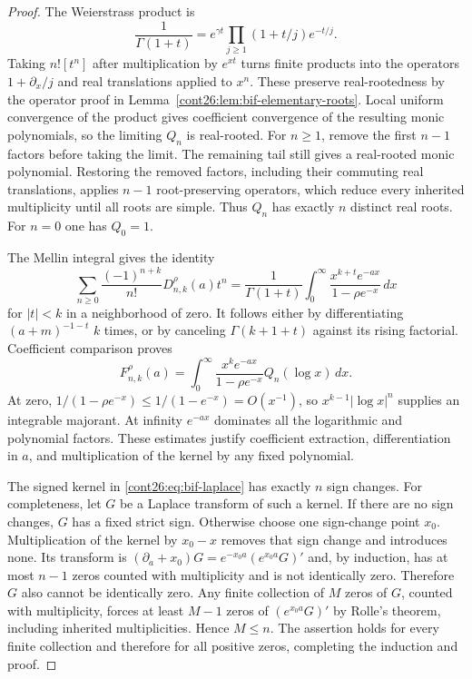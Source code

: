 \begin{proof}
The Weierstrass product is
\[
 \frac1{\Gamma(1+t)}=e^{\gamma t}
             \prod_{j\geq1}(1+t/j)e^{-t/j}.
\]
Taking $n![t^n]$ after multiplication by $e^{xt}$ turns finite products
into the operators $1+\partial_x/j$ and real translations applied to
$x^n$. These preserve real-rootedness by the operator proof in
Lemma~\ref{cont26:lem:bif-elementary-roots}. Local uniform convergence of the
product gives coefficient convergence of the resulting monic polynomials,
so the limiting $Q_n$ is real-rooted. For $n\geq1$, remove the first
$n-1$ factors before taking the limit. The remaining tail still gives
a real-rooted monic polynomial. Restoring the removed factors, including
their commuting real translations, applies $n-1$ root-preserving
operators, which reduce every inherited multiplicity until all roots
are simple. Thus $Q_n$ has exactly $n$ distinct real roots. For $n=0$
one has $Q_0=1$.

The Mellin integral gives the identity
\[
 \sum_{n\geq0}\frac{(-1)^{n+k}}{n!}D_{n,k}^{\rho}(a)t^n
   =\frac1{\Gamma(1+t)}\int_0^\infty
                   \frac{x^{k+t}e^{-ax}}{1-\rho e^{-x}}\,dx
\]
for $|t|<k$ in a neighborhood of zero. It follows either by
differentiating $(a+m)^{-1-t}$ $k$ times, or by canceling
$\Gamma(k+1+t)$ against its rising factorial. Coefficient comparison
proves
\begin{equation}\label{cont26:eq:bif-laplace}
 F_{n,k}^{\rho}(a)=\int_0^\infty
       \frac{x^ke^{-ax}}{1-\rho e^{-x}}Q_n(\log x)\,dx.
\end{equation}
At zero, $1/(1-\rho e^{-x})\leq1/(1-e^{-x})=O(x^{-1})$,
so $x^{k-1}|\log x|^n$ supplies an integrable majorant. At infinity
$e^{-ax}$ dominates all the logarithmic and polynomial factors.
These estimates justify coefficient extraction, differentiation in $a$,
and multiplication of the kernel by any fixed polynomial.

The signed kernel in \eqref{cont26:eq:bif-laplace} has exactly $n$ sign changes.
For completeness, let $G$ be a Laplace transform of such a kernel.
If there are no sign changes, $G$ has a fixed strict sign. Otherwise
choose one sign-change point $x_0$. Multiplication of the kernel by
$x_0-x$ removes that sign change and introduces none. Its transform is
$(\partial_a+x_0)G=e^{-x_0a}(e^{x_0a}G)'$ and, by induction, has at
most $n-1$ zeros counted with multiplicity and is not identically zero.
Therefore $G$ also cannot be identically zero. Any finite collection of
$M$ zeros of $G$, counted with multiplicity, forces at least $M-1$ zeros
of $(e^{x_0a}G)'$ by Rolle's theorem, including inherited multiplicities.
Hence $M\leq n$. The assertion holds for every finite collection and
therefore for all positive zeros, completing the induction and proof.
\end{proof}

